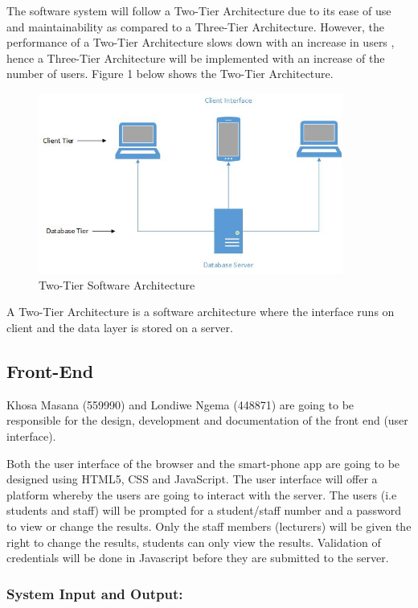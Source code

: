 \documentclass[10pt,onecolumn]{lab}
\begin{document}
The software system will follow a Two-Tier Architecture due to its ease of use and maintainability as compared to a Three-Tier Architecture. However, the performance of a Two-Tier Architecture slows down with an increase in users \cite{ref3}, hence a Three-Tier Architecture will be implemented with an increase of the number of users. Figure 1 below shows the Two-Tier Architecture.   
\begin{center}
\begin{figure}[h]
\centering
\includegraphics[width=10cm]{Two-Tier}
\caption{Two-Tier Software Architecture}
\end{figure}
\end{center}


A Two-Tier Architecture is a software architecture where the interface runs on client and the data layer is stored on a server\cite{ref4}.
\subsection{Front-End}

Khosa Masana (559990) and Londiwe Ngema (448871) are going to be responsible for the design, development and documentation of the front end (user interface).

Both the user interface of the browser and the smart-phone app are going to be designed using HTML5, CSS and JavaScript. The user interface will offer a platform whereby the users are going to interact with the server. The users (i.e students and staff) will be prompted for a student/staff number and a password to view or change the results. Only the staff members (lecturers) will be given the right to change the results, students can only view the results. Validation of credentials will be done in Javascript before they are submitted to the server.  

\subsubsection{\textbf{System Input and Output:}} 
 
\end{document}
